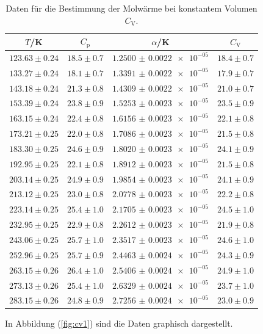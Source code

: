\begin{table}
  \centering
  \caption{Daten für die Bestimmung der Molwärme bei konstantem Volumen $C_\mathrm{V}$.}
  \label{tab:tab2}
  \begin{tabular}{c c c c}
    \toprule
		$T$/K & $C_\mathrm{p}$ & $\alpha$/K & $C_\mathrm{V}$ \\
    \midrule
    $123.63\pm0.24$ & $18.5\pm0.7$ & $\num{1.2500(22)e-05}$ & $18.4\pm0.7$ \\
    $133.27\pm0.24$ & $18.1\pm0.7$ & $\num{1.3391(22)e-05}$ & $17.9\pm0.7$ \\
    $143.18\pm0.24$ & $21.3\pm0.8$ & $\num{1.4309(22)e-05}$ & $21.0\pm0.7$ \\
    $153.39\pm0.24$ & $23.8\pm0.9$ & $\num{1.5253(23)e-05}$ & $23.5\pm0.9$ \\
    $163.15\pm0.24$ & $22.4\pm0.8$ & $\num{1.6156(23)e-05}$ & $22.1\pm0.8$ \\
    $173.21\pm0.25$ & $22.0\pm0.8$ & $\num{1.7086(23)e-05}$ & $21.5\pm0.8$ \\
    $183.30\pm0.25$ & $24.6\pm0.9$ & $\num{1.8020(23)e-05}$ & $24.1\pm0.9$ \\
    $192.95\pm0.25$ & $22.1\pm0.8$ & $\num{1.8912(23)e-05}$ & $21.5\pm0.8$ \\
    $203.14\pm0.25$ & $24.9\pm0.9$ & $\num{1.9854(23)e-05}$ & $24.1\pm0.9$ \\
    $213.12\pm0.25$ & $23.0\pm0.8$ & $\num{2.0778(23)e-05}$ & $22.2\pm0.8$ \\
    $223.14\pm0.25$ & $25.4\pm1.0$ & $\num{2.1705(23)e-05}$ & $24.5\pm1.0$ \\
    $232.95\pm0.25$ & $22.9\pm0.8$ & $\num{2.2612(23)e-05}$ & $21.9\pm0.8$ \\
    $243.06\pm0.25$ & $25.7\pm1.0$ & $\num{2.3517(23)e-05}$ & $24.6\pm1.0$ \\
    $252.96\pm0.25$ & $25.7\pm0.9$ & $\num{2.4463(24)e-05}$ & $24.3\pm0.9$ \\
    $263.15\pm0.26$ & $26.4\pm1.0$ & $\num{2.5406(24)e-05}$ & $24.9\pm1.0$ \\
    $273.13\pm0.26$ & $25.4\pm1.0$ & $\num{2.6329(24)e-05}$ & $23.7\pm1.0$ \\
    $283.15\pm0.26$ & $24.8\pm0.9$ & $\num{2.7256(24)e-05}$ & $23.0\pm0.9$ \\

    \bottomrule
  \end{tabular}
\end{table}
\FloatBarrier
\newpage
\noindent In Abbildung (\ref{fig:cv1}) sind die Daten graphisch dargestellt.
